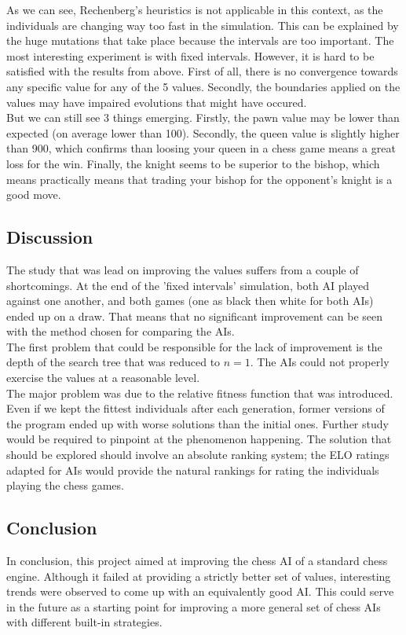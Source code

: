 \documentclass[11pt,a4paper,twocolumn]{article}
\begin{document}
As we can see, Rechenberg's heuristics is not applicable in this context, as the individuals are changing way too fast in the simulation. This can be explained by the huge mutations that take place because the intervals are too important. The most interesting experiment is with fixed intervals. However, it is hard to be satisfied with the results from above. First of all, there is no convergence towards any specific value for any of the 5 values. Secondly, the boundaries applied on the values may have impaired evolutions that might have occured.\\

But we can still see 3 things emerging. Firstly, the pawn value may be lower than expected (on average lower than 100). Secondly, the queen value is slightly higher than 900, which confirms than loosing your queen in a chess game means a great loss for the win. Finally, the knight seems to be superior to the bishop, which means practically means that trading your bishop for the opponent's knight is a good move.

\subsection{Discussion}
The study that was lead on improving the values suffers from a couple of shortcomings. At the end of the 'fixed intervals' simulation, both AI played against one another, and both games (one as black then white for both AIs) ended up on a draw. That means that no significant improvement can be seen with the method chosen for comparing the AIs.\\

The first problem that could be responsible for the lack of improvement is the depth of the search tree that was reduced to $n=1$. The AIs could not properly exercise the values at a reasonable level.\\
The major problem was due to the relative fitness function that was introduced. Even if we kept the fittest individuals after each generation, former versions of the program ended up with worse solutions than the initial ones. Further study would be required to pinpoint at the phenomenon happening. The solution that should be explored should involve an absolute ranking system; the ELO ratings adapted for AIs would provide the natural rankings for rating the individuals playing the chess games.

\subsection{Conclusion}
In conclusion, this project aimed at improving the chess AI of a standard chess engine. Although it failed at providing a strictly better set of values, interesting trends were observed to come up with an equivalently good AI. This could serve in the future as a starting point for improving a more general set of chess AIs with different built-in strategies.



\end{document}
